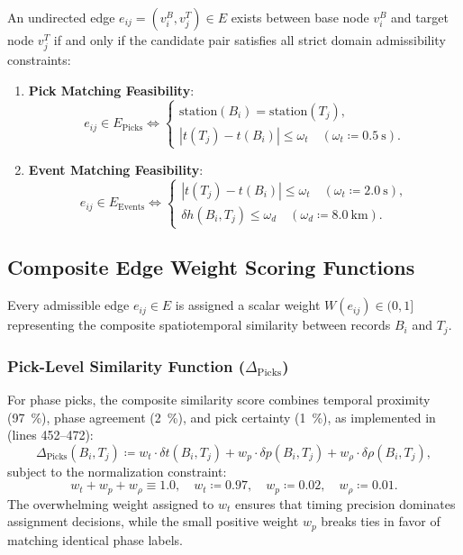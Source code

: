 An undirected edge $e_{ij} = (v_i^B, v_j^T) \in E$ exists between
base node $v_i^B$ and target node $v_j^T$ if and only if the
candidate pair satisfies all strict domain admissibility constraints:
\begin{enumerate}
  \item \textbf{Pick Matching Feasibility}:
    \begin{equation}
      e_{ij} \in E_{\mathrm{Picks}} \iff
      \begin{cases}
        \mathrm{station}(B_i) = \mathrm{station}(T_j), \\
        |t(T_j) - t(B_i)| \le \omega_t \quad (\omega_t \coloneqq
        \qty{0.5}{\second}).
      \end{cases}
    \end{equation}
  \item \textbf{Event Matching Feasibility}:
    \begin{equation}
      e_{ij} \in E_{\mathrm{Events}} \iff
      \begin{cases}
        |t(T_j) - t(B_i)| \le \omega_t \quad (\omega_t \coloneqq
        \qty{2.0}{\second}), \\
        \delta h(B_i, T_j) \le \omega_d \quad (\omega_d \coloneqq
        \qty{8.0}{\kilo\meter}).
      \end{cases}
    \end{equation}
\end{enumerate}

\subsection{Composite Edge Weight Scoring Functions}
Every admissible edge $e_{ij} \in E$ is assigned a scalar weight
$W(e_{ij}) \in (0, 1]$ representing the composite spatiotemporal
similarity between records $B_i$ and $T_j$.

\subsubsection{Pick-Level Similarity Function ($\Delta_{\mathrm{Picks}}$)}
For phase picks, the composite similarity score combines temporal
proximity (\qty{97}{\percent}), phase agreement (\qty{2}{\percent}),
and pick certainty (\qty{1}{\percent}),
as implemented in  (lines 452--472):
\begin{equation}
  \Delta_{\mathrm{Picks}}(B_i, T_j) \coloneqq w_t \cdot \delta t(B_i, T_j) +
  w_p \cdot \delta p(B_i, T_j) + w_\rho \cdot \delta \rho(B_i, T_j),
\end{equation}
subject to the normalization constraint:
\begin{equation}
  w_t + w_p + w_\rho \equiv \num{1.0}, \quad w_t \coloneqq
  \num{0.97}, \quad w_p \coloneqq \num{0.02},
  \quad w_\rho \coloneqq \num{0.01}.
\end{equation}
The overwhelming weight assigned to $w_t$ ensures that timing
precision dominates assignment decisions, while the small positive
weight $w_p$ breaks ties in favor of matching identical phase labels.

